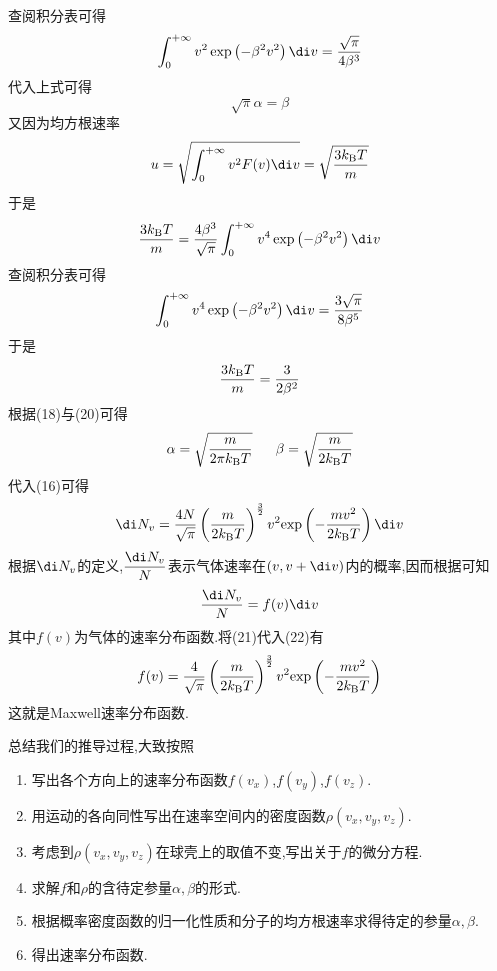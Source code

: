 \documentclass{ctexart}
\begin{document}
\begin{derivation}
    查阅积分表可得
    \[\int_0^{+\infty}v^2\exp\left(-\beta^2v^2\right)\di v=\dfrac{\sqrt\pi}{4\beta^3}\]
    代入上式可得
    \begin{equation}
        \sqrt\pi\alpha=\beta
    \end{equation}
    又因为均方根速率
    \begin{equation}
        u=\sqrt{\int_{0}^{+\infty}v^2F(v)\di v}=\sqrt{\dfrac{3k_\text BT}{m}}
    \end{equation}
    于是
    \[\dfrac{3k_\text BT}{m}=\dfrac{4\beta^3}{\sqrt\pi}\int_0^{+\infty}v^4\exp\left(-\beta^2v^2\right)\di v\]
    查阅积分表可得
    \[\int_0^{+\infty}v^4\exp\left(-\beta^2v^2\right)\di v=\dfrac{3\sqrt\pi}{8\beta^5}\]
    于是
    \begin{equation}
        \dfrac{3k_\text BT}{m}=\dfrac{3}{2\beta^2}
    \end{equation}
    根据(18)与(20)可得
    \[\alpha=\sqrt{\dfrac{m}{2\pi k_\text BT}}\ \ \ \ \ \beta=\sqrt{\dfrac{m}{2k_\text BT}}\]
    代入(16)可得
    \begin{equation}
        \di N_v=\dfrac{4N}{\sqrt\pi}\left(\dfrac{m}{2k_\text BT}\right)^{\frac32}v^2\text{exp}\left(-\dfrac{mv^2}{2k_\text BT}\right)\di v
    \end{equation}
    根据$\di N_v$的定义,$\dfrac{\di N_v}{N}$表示气体速率在$(v,v+\di v)$内的概率,因而根据可知
    \begin{equation}
        \dfrac{\di N_v}{N}=f(v)\di v
    \end{equation}
    其中$f(v)$为气体的速率分布函数.将(21)代入(22)有
    \[f(v)=\dfrac{4}{\sqrt\pi}\left(\dfrac{m}{2k_\text BT}\right)^{\frac32}v^2\text{exp}\left(-\dfrac{mv^2}{2k_\text BT}\right)\]
    这就是Maxwell速率分布函数.
\end{derivation}\setcounter{equation}{0}
总结我们的推导过程,大致按照
\begin{enumerate}[label=\tbf{\arabic*.}]
    \item 写出各个方向上的速率分布函数$f\left(v_x\right)$,$f\left(v_y\right)$,$f\left(v_z\right)$.
    \item 用运动的各向同性写出在速率空间内的密度函数$\rho\left(v_x,v_y,v_z\right)$.
    \item 考虑到$\rho\left(v_x,v_y,v_z\right)$在球壳上的取值不变,写出关于$f$的微分方程.
    \item 求解$f$和$\rho$的含待定参量$\alpha,\beta$的形式.
    \item 根据概率密度函数的归一化性质和分子的均方根速率求得待定的参量$\alpha,\beta$.
    \item 得出速率分布函数.
\end{enumerate}
\end{document}
